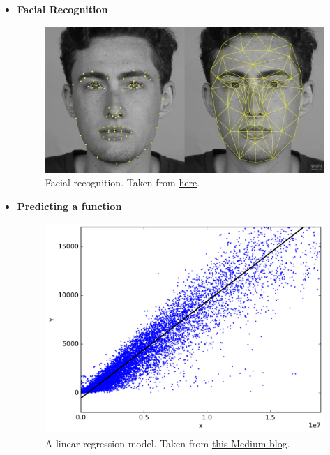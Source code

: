 \documentclass{article}
\begin{document}
\begin{itemize}
            \clearpage
            
            \item \textbf{Facial Recognition}
                
                \begin{figure}[h]
                    \includegraphics[width = \textwidth]{facerec.jpg}
                    \caption{Facial recognition. Taken from \href{https://rapidapi.com/blog/top-facial-recognition-apis/}{here}.}
                \end{figure}
            
            \clearpage

            \item \textbf{Predicting a function}    
                \begin{figure}[h]
                    \includegraphics[width = \textwidth]{regression.png}
                    \caption{A linear regression model. Taken from \href{https://medium.com/@amarbudhiraja/ml-101-linear-regression-tutorial-1e40e29f1934}{this Medium blog}.}
                \end{figure}
            

\end{itemize}
\end{document}
